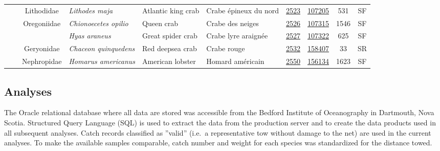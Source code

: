 \documentclass[12pt]{article}\usepackage[]{graphicx}\usepackage[]{color}
\begin{document}
\begin{landscape}
\begin{longtable}[t]{ccc>{\centering\arraybackslash}p{3cm}>{\centering\arraybackslash}p{3cm}>{\centering\arraybackslash}p{3cm}>{}c>{}ccc}
\nopagebreak
\hspace{1em}\hspace{1em} &  & Lithodidae & \em{Lithodes maja} & Atlantic king crab & Crabe épineux du nord & \href{#sec:2523}{2523} & \href{http://www.marinespecies.org/aphia.php?p=taxdetails&id=107205}{107205} & 531 & SF\\
\nopagebreak
\hspace{1em}\hspace{1em} &  & Oregoniidae & \em{Chionoecetes opilio} & Queen crab & Crabe des neiges & \href{#sec:2526}{2526} & \href{http://www.marinespecies.org/aphia.php?p=taxdetails&id=107315}{107315} & 1546 & SF\\
\nopagebreak
\hspace{1em}\hspace{1em} &  &  & \em{Hyas araneus} & Great spider crab & Crabe lyre araignée & \href{#sec:2527}{2527} & \href{http://www.marinespecies.org/aphia.php?p=taxdetails&id=107322}{107322} & 625 & SF\\
\nopagebreak
\hspace{1em}\hspace{1em} &  & Geryonidae & \em{Chaceon quinquedens} & Red deepsea crab & Crabe rouge & \href{#sec:2532}{2532} & \href{http://www.marinespecies.org/aphia.php?p=taxdetails&id=158407}{158407} & 33 & SR\\
\nopagebreak
\hspace{1em}\hspace{1em} &  & Nephropidae & \em{Homarus americanus} & American lobster & Homard américain & \href{#sec:2550}{2550} & \href{http://www.marinespecies.org/aphia.php?p=taxdetails&id=156134}{156134} & 1623 & SF\\*
\end{longtable}
\end{landscape}
\endgroup{}

\hypertarget{analyses}{%
\subsection{Analyses}\label{analyses}}

The Oracle relational database where all data are stored was accessible from the Bedford Institute of Oceanography in Dartmouth, Nova Scotia. Structured Query Language (SQL) is used to extract the data from the production server and to create the data products used in all subsequent analyses. Catch records classified as ''valid'' (i.e.~a representative tow without damage to the net) are used in the current analyses. To make the available samples comparable, catch number and weight for each species was standardized for the distance towed.
\end{document}
